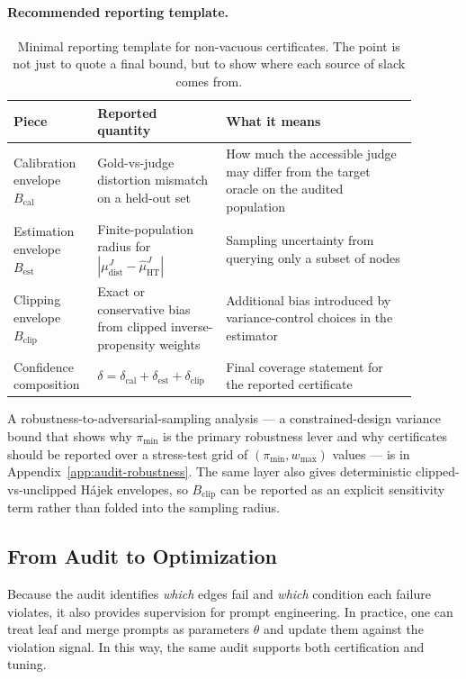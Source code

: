 \paragraph{Recommended reporting template.}
\begin{table}[t]
\centering\small
\begin{tabular}{p{0.17\linewidth}p{0.28\linewidth}p{0.44\linewidth}}
\toprule
Piece & Reported quantity & What it means \\
\midrule
Calibration envelope $B_{\mathrm{cal}}$ & Gold-vs-judge distortion mismatch on a held-out set & How much the accessible judge may differ from the target oracle on the audited population \\
Estimation envelope $B_{\mathrm{est}}$ & Finite-population radius for $|\mu_{\mathrm{dist}}^{J}-\hat{\mu}_{\mathrm{HT}}^{J}|$ & Sampling uncertainty from querying only a subset of nodes \\
Clipping envelope $B_{\mathrm{clip}}$ & Exact or conservative bias from clipped inverse-propensity weights & Additional bias introduced by variance-control choices in the estimator \\
Confidence composition & $\delta=\delta_{\mathrm{cal}}+\delta_{\mathrm{est}}+\delta_{\mathrm{clip}}$ & Final coverage statement for the reported certificate \\
\bottomrule
\end{tabular}
\caption{Minimal reporting template for non-vacuous certificates. The point is not just to quote a final bound, but to show where each source of slack comes from.}
\label{tab:reporting-template}
\end{table}

A robustness-to-adversarial-sampling analysis --- a constrained-design variance bound that shows why $\pi_{\min}$ is the primary robustness lever and why certificates should be reported over a stress-test grid of $(\pi_{\min}, w_{\max})$ values --- is in Appendix~\ref{app:audit-robustness}. The same layer also gives deterministic clipped-vs-unclipped H\'ajek envelopes, so $B_{\mathrm{clip}}$ can be reported as an explicit sensitivity term rather than folded into the sampling radius.

\subsection{From Audit to Optimization}

Because the audit identifies \emph{which} edges fail and \emph{which} condition each failure violates, it also provides supervision for prompt engineering. In practice, one can treat leaf and merge prompts as parameters $\theta$ and update them against the violation signal. In this way, the same audit supports both certification and tuning.

